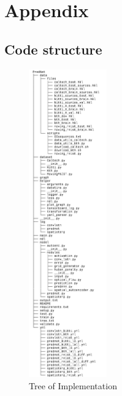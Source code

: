 \section*{Appendix} \label{section::appendix}
 \subsection*{Code structure}
  \begin{figure}[H]
   \includegraphics[width=0.3\textwidth]{../Images/tree.png}
   \centering
   \caption{Tree of Implementation}
   \label{fig:tree}
  \end{figure}\noindent
